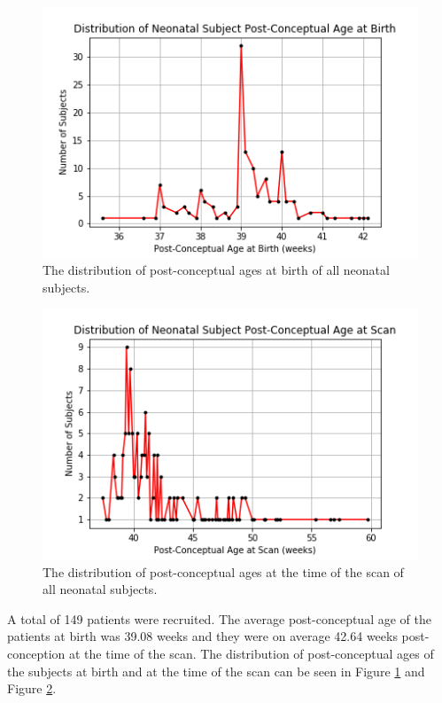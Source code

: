 \begin{figure}
\centering
\includegraphics[width=.75\textwidth]{5/demo_neonate_subj_pca.png}
\caption{The distribution of post-conceptual ages at birth of all neonatal subjects.}
\label{ch5:neonates:birthpca}
\end{figure}

\begin{figure}
\centering
\includegraphics[width=.75\textwidth]{5/demo_neonate_scan_pca.png}
\caption{The distribution of post-conceptual ages at the time of the scan of all neonatal subjects.}
\label{ch5:neonates:scanpca}
\end{figure}

A total of 149 patients were recruited. The average post-conceptual age of the patients at birth was 39.08 weeks and they were on average 42.64 weeks post-conception at the time of the scan. The distribution of post-conceptual ages of the subjects at birth and at the time of the scan can be seen in Figure \ref{ch5:neonates:birthpca} and Figure \ref{ch5:neonates:scanpca}. 

